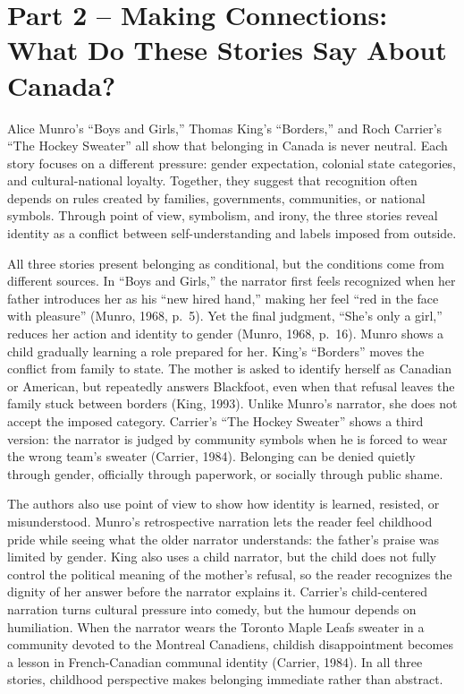 \documentclass[12pt]{article}
\begin{document}
\section*{Part 2 -- Making Connections: What Do These Stories Say About Canada?}

Alice Munro's ``Boys and Girls,'' Thomas King's ``Borders,'' and Roch Carrier's ``The Hockey Sweater'' all show that belonging in Canada is never neutral. Each story focuses on a different pressure: gender expectation, colonial state categories, and cultural-national loyalty. Together, they suggest that recognition often depends on rules created by families, governments, communities, or national symbols. Through point of view, symbolism, and irony, the three stories reveal identity as a conflict between self-understanding and labels imposed from outside.

All three stories present belonging as conditional, but the conditions come from different sources. In ``Boys and Girls,'' the narrator first feels recognized when her father introduces her as his ``new hired hand,'' making her feel ``red in the face with pleasure'' (Munro, 1968, p.~5). Yet the final judgment, ``She's only a girl,'' reduces her action and identity to gender (Munro, 1968, p.~16). Munro shows a child gradually learning a role prepared for her. King's ``Borders'' moves the conflict from family to state. The mother is asked to identify herself as Canadian or American, but repeatedly answers Blackfoot, even when that refusal leaves the family stuck between borders (King, 1993). Unlike Munro's narrator, she does not accept the imposed category. Carrier's ``The Hockey Sweater'' shows a third version: the narrator is judged by community symbols when he is forced to wear the wrong team's sweater (Carrier, 1984). Belonging can be denied quietly through gender, officially through paperwork, or socially through public shame.

The authors also use point of view to show how identity is learned, resisted, or misunderstood. Munro's retrospective narration lets the reader feel childhood pride while seeing what the older narrator understands: the father's praise was limited by gender. King also uses a child narrator, but the child does not fully control the political meaning of the mother's refusal, so the reader recognizes the dignity of her answer before the narrator explains it. Carrier's child-centered narration turns cultural pressure into comedy, but the humour depends on humiliation. When the narrator wears the Toronto Maple Leafs sweater in a community devoted to the Montreal Canadiens, childish disappointment becomes a lesson in French-Canadian communal identity (Carrier, 1984). In all three stories, childhood perspective makes belonging immediate rather than abstract.
\end{document}
